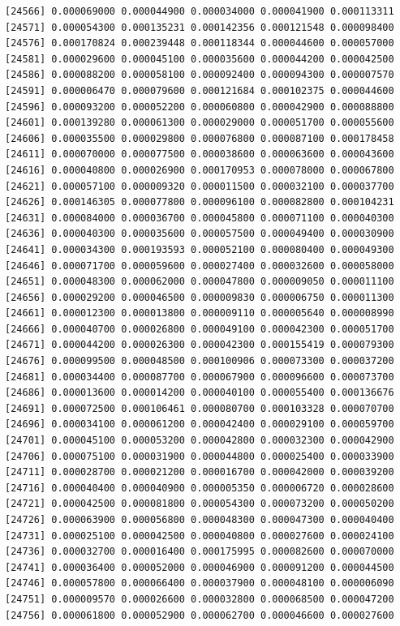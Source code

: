 \documentclass[]{article}
\begin{document}
\begin{verbatim}
[24566] 0.000069000 0.000044900 0.000034000 0.000041900 0.000113311
[24571] 0.000054300 0.000135231 0.000142356 0.000121548 0.000098400
[24576] 0.000170824 0.000239448 0.000118344 0.000044600 0.000057000
[24581] 0.000029600 0.000045100 0.000035600 0.000044200 0.000042500
[24586] 0.000088200 0.000058100 0.000092400 0.000094300 0.000007570
[24591] 0.000006470 0.000079600 0.000121684 0.000102375 0.000044600
[24596] 0.000093200 0.000052200 0.000060800 0.000042900 0.000088800
[24601] 0.000139280 0.000061300 0.000029000 0.000051700 0.000055600
[24606] 0.000035500 0.000029800 0.000076800 0.000087100 0.000178458
[24611] 0.000070000 0.000077500 0.000038600 0.000063600 0.000043600
[24616] 0.000040800 0.000026900 0.000170953 0.000078000 0.000067800
[24621] 0.000057100 0.000009320 0.000011500 0.000032100 0.000037700
[24626] 0.000146305 0.000077800 0.000096100 0.000082800 0.000104231
[24631] 0.000084000 0.000036700 0.000045800 0.000071100 0.000040300
[24636] 0.000040300 0.000035600 0.000057500 0.000049400 0.000030900
[24641] 0.000034300 0.000193593 0.000052100 0.000080400 0.000049300
[24646] 0.000071700 0.000059600 0.000027400 0.000032600 0.000058000
[24651] 0.000048300 0.000062000 0.000047800 0.000009050 0.000011100
[24656] 0.000029200 0.000046500 0.000009830 0.000006750 0.000011300
[24661] 0.000012300 0.000013800 0.000009110 0.000005640 0.000008990
[24666] 0.000040700 0.000026800 0.000049100 0.000042300 0.000051700
[24671] 0.000044200 0.000026300 0.000042300 0.000155419 0.000079300
[24676] 0.000099500 0.000048500 0.000100906 0.000073300 0.000037200
[24681] 0.000034400 0.000087700 0.000067900 0.000096600 0.000073700
[24686] 0.000013600 0.000014200 0.000040100 0.000055400 0.000136676
[24691] 0.000072500 0.000106461 0.000080700 0.000103328 0.000070700
[24696] 0.000034100 0.000061200 0.000042400 0.000029100 0.000059700
[24701] 0.000045100 0.000053200 0.000042800 0.000032300 0.000042900
[24706] 0.000075100 0.000031900 0.000044800 0.000025400 0.000033900
[24711] 0.000028700 0.000021200 0.000016700 0.000042000 0.000039200
[24716] 0.000040400 0.000040900 0.000005350 0.000006720 0.000028600
[24721] 0.000042500 0.000081800 0.000054300 0.000073200 0.000050200
[24726] 0.000063900 0.000056800 0.000048300 0.000047300 0.000040400
[24731] 0.000025100 0.000042500 0.000040800 0.000027600 0.000024100
[24736] 0.000032700 0.000016400 0.000175995 0.000082600 0.000070000
[24741] 0.000036400 0.000052000 0.000046900 0.000091200 0.000044500
[24746] 0.000057800 0.000066400 0.000037900 0.000048100 0.000006090
[24751] 0.000009570 0.000026600 0.000032800 0.000068500 0.000047200
[24756] 0.000061800 0.000052900 0.000062700 0.000046600 0.000027600

\end{verbatim}
\end{document}
